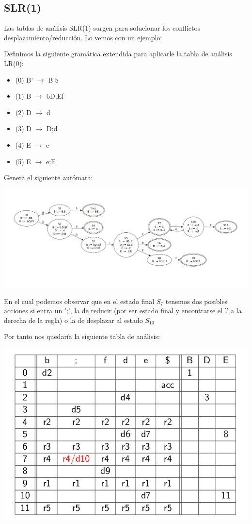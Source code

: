 \documentclass{apuntes}
\begin{document}
\subsection{SLR(1)}

Las tablas de análisis SLR(1) surgen para solucionar los conflictos desplazamiento/reducción. Lo vemos con un ejemplo:

\begin{example}
Definimos la siguiente gramática extendida para aplicarle la tabla de análisis LR(0):

\begin{itemize}
\item (0) B' $\rightarrow$ B \$
\item (1) B $\rightarrow$ bD;Ef
\item (2) D $\rightarrow$ d
\item (3) D $\rightarrow$ D;d
\item (4) E $\rightarrow$ e
\item (5) E $\rightarrow$ e;E
\end{itemize}

Genera el siguiente autómata:
\begin{center}
\includegraphics[scale=0.4]{img/automatalr0conflicto.jpg}
\end{center}

En el cual podemos observar que en el estado final $S_7$ tenemos dos posibles acciones si entra un ';', la de reducir (por ser estado final y encontrarse el '.' a la derecha de la regla) o la de desplazar al estado $S_{10}$

Por tanto nos quedaría la siguiente tabla de análisis:

\begin{center}
\includegraphics[scale=0.3]{img/tablaanalisislr0conflicto.jpg}
\end{center}


\end{example}
\end{document}
